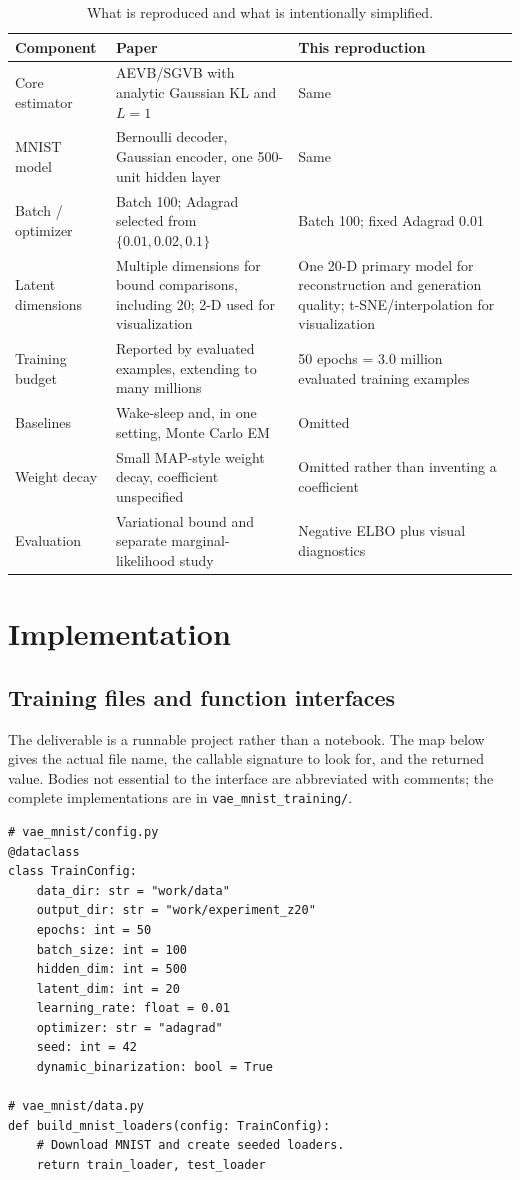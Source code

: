 \documentclass[11pt]{article}
\newcommand{\code}[1]{\texttt{#1}}
\begin{document}
\begin{table}[H]
\centering
\caption{What is reproduced and what is intentionally simplified.}
\begin{tabularx}{\textwidth}{@{}p{}X X@{}}
\toprule
Component & Paper & This reproduction \\
\midrule
Core estimator & AEVB/SGVB with analytic Gaussian KL and $L=1$ & Same \\
MNIST model & Bernoulli decoder, Gaussian encoder, one 500-unit hidden layer & Same \\
Batch / optimizer & Batch 100; Adagrad selected from $\{0.01,0.02,0.1\}$ & Batch 100; fixed Adagrad 0.01 \\
Latent dimensions & Multiple dimensions for bound comparisons, including 20; 2-D used for visualization & One 20-D primary model for reconstruction and generation quality; t-SNE/interpolation for visualization \\
Training budget & Reported by evaluated examples, extending to many millions & 50 epochs = 3.0 million evaluated training examples \\
Baselines & Wake-sleep and, in one setting, Monte Carlo EM & Omitted \\
Weight decay & Small MAP-style weight decay, coefficient unspecified & Omitted rather than inventing a coefficient \\
Evaluation & Variational bound and separate marginal-likelihood study & Negative ELBO plus visual diagnostics \\
\bottomrule
\end{tabularx}
\end{table}

\section{Implementation}

\subsection{Training files and function interfaces}

The deliverable is a runnable project rather than a notebook. The map below gives the actual file name, the callable signature to look for, and the returned value. Bodies not essential to the interface are abbreviated with comments; the complete implementations are in \code{vae\_mnist\_training/}.

\begin{lstlisting}[style=pythonstyle,caption={Configuration, data, model, and loss interfaces.}]
# vae_mnist/config.py
@dataclass
class TrainConfig:
    data_dir: str = "work/data"
    output_dir: str = "work/experiment_z20"
    epochs: int = 50
    batch_size: int = 100
    hidden_dim: int = 500
    latent_dim: int = 20
    learning_rate: float = 0.01
    optimizer: str = "adagrad"
    seed: int = 42
    dynamic_binarization: bool = True

# vae_mnist/data.py
def build_mnist_loaders(config: TrainConfig):
    # Download MNIST and create seeded loaders.
    return train_loader, test_loader
\end{lstlisting}
\end{document}
